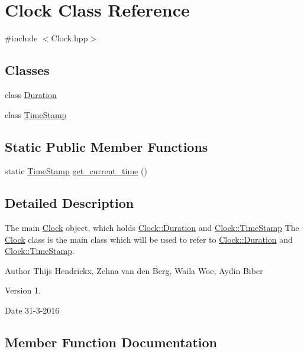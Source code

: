 \hypertarget{class_clock}{}\section{Clock Class Reference}
\label{class_clock}


{\ttfamily \#include $<$Clock.\+hpp$>$}

\subsection*{Classes}
\begin{DoxyCompactItemize}
\item 
class \hyperlink{class_clock_1_1_duration}{Duration}
\item 
class \hyperlink{class_clock_1_1_time_stamp}{Time\+Stamp}
\end{DoxyCompactItemize}
\subsection*{Static Public Member Functions}
\begin{DoxyCompactItemize}
\item 
static \hyperlink{class_clock_1_1_time_stamp}{Time\+Stamp} \hyperlink{class_clock_a3affeaec2b8eef4880110172a3753544}{get\+\_\+current\+\_\+time} ()
\end{DoxyCompactItemize}


\subsection{Detailed Description}
The main \hyperlink{class_clock}{Clock} object, which holds \hyperlink{class_clock_1_1_duration}{Clock\+::\+Duration} and \hyperlink{class_clock_1_1_time_stamp}{Clock\+::\+Time\+Stamp} The \hyperlink{class_clock}{Clock} class is the main class which will be used to refer to \hyperlink{class_clock_1_1_duration}{Clock\+::\+Duration} and \hyperlink{class_clock_1_1_time_stamp}{Clock\+::\+Time\+Stamp}. \begin{DoxyAuthor}{Author}
Thijs Hendrickx, Zehna van den Berg, Waila Woe, Aydin Biber 
\end{DoxyAuthor}
\begin{DoxyVersion}{Version}
1. 
\end{DoxyVersion}
\begin{DoxyDate}{Date}
31-\/3-\/2016 
\end{DoxyDate}


\subsection{Member Function Documentation}
